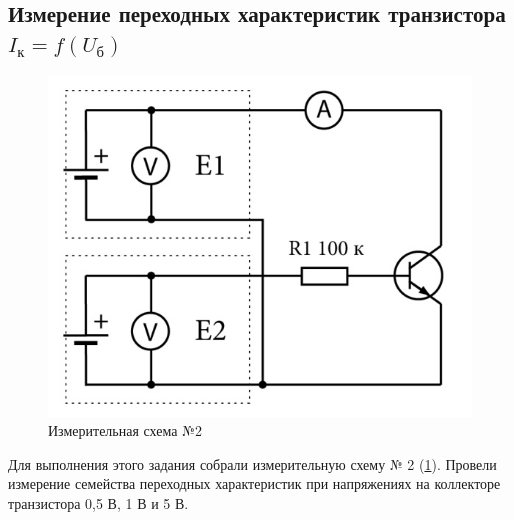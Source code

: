 \subsection{Измерение переходных характеристик транзистора $I_\text{к}=f(U_\text{б})$}
\begin{figure}[H]
	\centering
	\includegraphics[width=0.6\linewidth]{fig/shema2}
	\caption{Измерительная схема №2}
	\label{fig:10}
\end{figure}
Для выполнения этого задания собрали измерительную схему
№ 2 (\ref{fig:10}). Провели измерение семейства переходных характеристик при
напряжениях на коллекторе транзистора 0,5 В, 1 В и 5 В.
